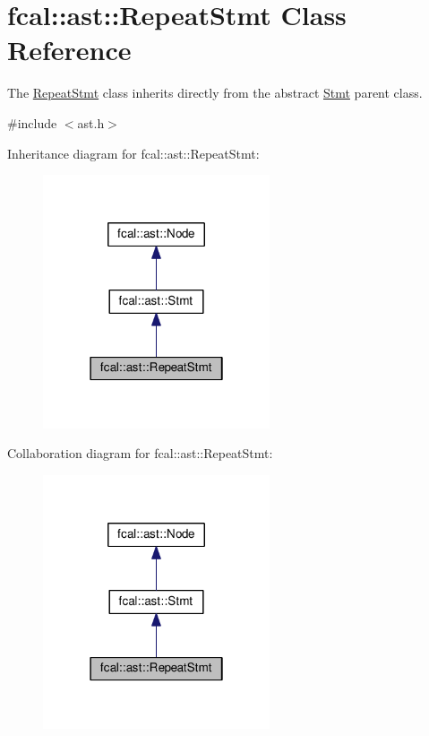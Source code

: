 \hypertarget{classfcal_1_1ast_1_1RepeatStmt}{}\section{fcal\+:\+:ast\+:\+:Repeat\+Stmt Class Reference}
\label{classfcal_1_1ast_1_1RepeatStmt}


The \hyperlink{classfcal_1_1ast_1_1RepeatStmt}{Repeat\+Stmt} class inherits directly from the abstract \hyperlink{classfcal_1_1ast_1_1Stmt}{Stmt} parent class.  




{\ttfamily \#include $<$ast.\+h$>$}



Inheritance diagram for fcal\+:\+:ast\+:\+:Repeat\+Stmt\+:\nopagebreak
\begin{figure}[H]
\begin{center}
\leavevmode
\includegraphics[width=190pt]{classfcal_1_1ast_1_1RepeatStmt__inherit__graph}
\end{center}
\end{figure}


Collaboration diagram for fcal\+:\+:ast\+:\+:Repeat\+Stmt\+:\nopagebreak
\begin{figure}[H]
\begin{center}
\leavevmode
\includegraphics[width=190pt]{classfcal_1_1ast_1_1RepeatStmt__coll__graph}
\end{center}
\end{figure}

